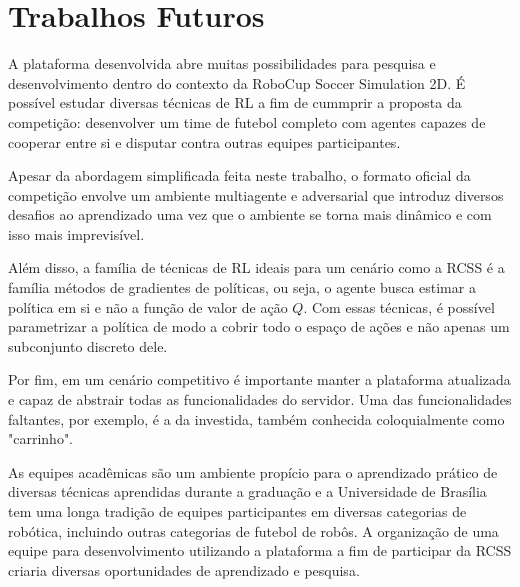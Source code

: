 \section{Trabalhos Futuros}

A plataforma desenvolvida abre muitas possibilidades para pesquisa e desenvolvimento dentro do contexto da RoboCup Soccer Simulation 2D. É possível estudar diversas técnicas de RL a fim de cummprir a proposta da competição: desenvolver um time de futebol completo com agentes capazes de cooperar entre si e disputar contra outras equipes participantes.

Apesar da abordagem simplificada feita neste trabalho, o formato oficial da competição envolve um ambiente multiagente e adversarial que introduz diversos desafios ao aprendizado uma vez que o ambiente se torna mais dinâmico e com isso mais imprevisível.

Além disso, a família de técnicas de RL ideais para um cenário como a RCSS é a família métodos de gradientes de políticas, ou seja, o agente busca estimar a política em si e não a função de valor de ação $Q$. Com essas técnicas, é possível parametrizar a política de modo a cobrir todo o espaço de ações e não apenas um subconjunto discreto dele.

Por fim, em um cenário competitivo é importante manter a plataforma atualizada e capaz de abstrair todas as funcionalidades do servidor. Uma das funcionalidades faltantes, por exemplo, é a da investida, também conhecida coloquialmente como "carrinho".

As equipes acadêmicas são um ambiente propício para o aprendizado prático de diversas técnicas aprendidas durante a graduação e a Universidade de Brasília tem uma longa tradição de equipes participantes em diversas categorias de robótica, incluindo outras categorias de futebol de robôs. A organização de uma equipe para desenvolvimento utilizando a plataforma a fim de participar da RCSS criaria diversas oportunidades de aprendizado e pesquisa.


